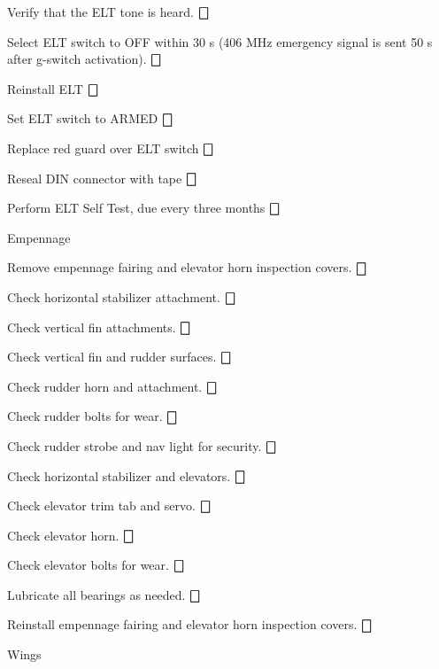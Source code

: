 \begin{enumerate*}
\begin{enumerate*}
\begin{enumerate*}
\begin{enumerate*}
  		  \end{enumerate*} 
  		\item Verify that the ELT tone is heard.  \dotfill $\bigbox$
  		\item Select ELT switch to OFF within 30 s (406 MHz emergency signal is sent 50 s after g-switch activation).  \dotfill $\bigbox$
  	\end{enumerate*}
  	\item Reinstall ELT \dotfill $\bigbox$
  	\item Set ELT switch to ARMED \dotfill $\bigbox$
  	\item Replace red guard over ELT switch \dotfill $\bigbox$
  	\item Reseal DIN connector with tape \dotfill $\bigbox$
  	\item Perform ELT Self Test, due every three months \dotfill $\bigbox$
  \end{enumerate*}
	\item{Empennage} 
	\begin{enumerate*}
		\item Remove empennage fairing and elevator horn inspection covers.  \dotfill $\bigbox$
		\item Check horizontal stabilizer attachment.  \dotfill $\bigbox$
		\item Check vertical fin attachments.  \dotfill $\bigbox$
		\item Check vertical fin and rudder surfaces.  \dotfill $\bigbox$
		\item Check rudder horn and attachment.  \dotfill $\bigbox$
		\item Check rudder bolts for wear.  \dotfill $\bigbox$
		\item Check rudder strobe and nav light for security.  \dotfill $\bigbox$
		\item Check horizontal stabilizer and elevators.  \dotfill $\bigbox$
		\item Check elevator trim tab and servo.  \dotfill $\bigbox$
		\item Check elevator horn.  \dotfill $\bigbox$
		\item Check elevator bolts for wear.  \dotfill $\bigbox$
		\item Lubricate all bearings as needed.  \dotfill $\bigbox$
		\item Reinstall empennage fairing and elevator horn inspection covers.  \dotfill $\bigbox$
	\end{enumerate*}
	\item{Wings} 
	\begin{enumerate*}

\end{enumerate*}
\end{enumerate*}
